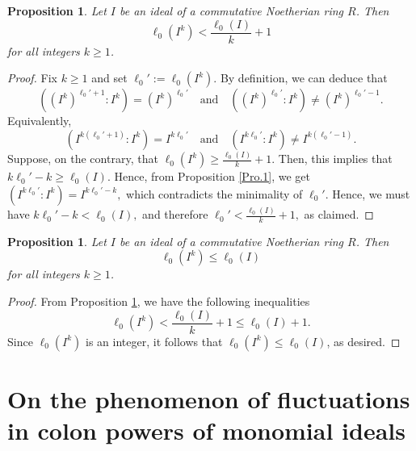 \documentclass[11pt]{amsart}
\newtheorem{proposition}[theorem]{Proposition}
\begin{document}
\begin{proposition} \label{Pro.2}
Let $I$ be an ideal of a commutative Noetherian ring $R$. Then
\[
\ell_0(I^k) < \frac{\ell_0(I)}{k} + 1
\]
for all integers $k \geq 1$.
\end{proposition}

\begin{proof}
Fix $k \geq 1$ and set $\ell_0' := \ell_0(I^k)$. By definition, we can deduce that 
$$((I^k)^{\ell_0'+1} : I^k)= (I^k)^{\ell_0'} \quad \text{and} \quad ((I^k)^{\ell_0'} : I^k) \neq (I^k)^{\ell_0'-1}.$$
Equivalently,
\[
(I^{k(\ell_0'+1)} : I^k)= I^{k\ell_0'}
\quad \text{and} \quad
(I^{k\ell_0'} : I^k) \neq I^{k(\ell_0'-1)}.
\]
Suppose, on the contrary,  that  $\ell_0(I^k) \geq \frac{\ell_0(I)}{k} + 1$. Then, this implies that 
 $k\ell_0' - k \geq \ell_0(I)$. Hence, from  Proposition \ref{Pro.1}, we get 
  $(I^{k\ell_0'} : I^k)= I^{k\ell_0' - k},$ which contradicts the minimality of $\ell_0'$. Hence, we must have 
  $k\ell_0' - k < \ell_0(I),$ and therefore $\ell_0' < \frac{\ell_0(I)}{k} + 1,$ as claimed. 
\end{proof}



\begin{proposition}
Let $I$ be an ideal of a commutative Noetherian ring $R$. Then
\[
\ell_0(I^k) \leq \ell_0(I)
\]
for all integers $k \geq 1$.
\end{proposition}

\begin{proof}
 From Proposition \ref{Pro.2}, we have the following inequalities
\[
\ell_0(I^k) < \frac{\ell_0(I)}{k} + 1 \leq \ell_0(I) + 1.
\]
Since $\ell_0(I^k)$ is an integer, it follows that $\ell_0(I^k) \leq \ell_0(I)$, as desired. 
\end{proof}






\section{On the  phenomenon  of fluctuations  in colon powers of monomial ideals} \label{Main Section 2}
 
\end{document}
